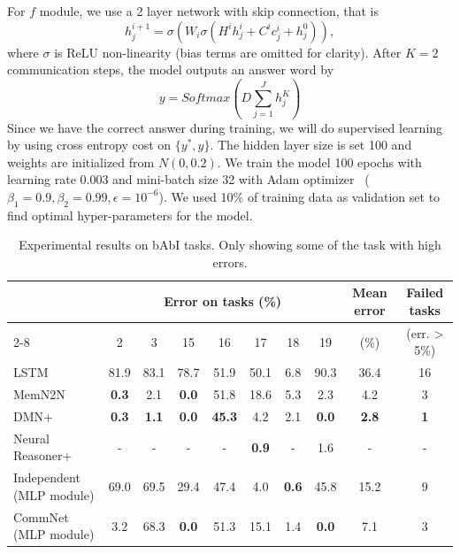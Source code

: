 \documentclass{article}
\begin{document}
For $f$ module, we use a 2 layer network with skip connection, that is 
\[ h_j^{i+1} = \sigma(W_i \sigma(H^i h_j^i + C^i c_j^i + h_j^0 ) ), \]
where $\sigma$ is ReLU non-linearity (bias terms are omitted for clarity). After $K=2$ communication steps, the model outputs an answer word by 
\[ y = Softmax(D \sum_{j=1}^J h_j^K) \]
Since we have the correct answer during training, we will do
supervised learning by using cross entropy cost on $\{y^*, y\}$. The
hidden layer size is set 100 and weights are initialized from
$N(0,0.2)$. We train the model 100 epochs with learning rate 0.003 and
mini-batch size 32 with Adam optimizer~\cite{kingma2015}
($\beta_1=0.9, \beta_2=0.99, \epsilon=10^{-6}$). We used 10\% of
training data as validation set to find optimal hyper-parameters for
the model.

\begin{table}[h]
\centering
\small
\setlength{\tabcolsep}{4pt}
\begin{tabular}{|l|c|c|c|c|c|c|c|c|c|} 
\hline
                  & \multicolumn{7}{|c|}{Error on tasks (\%)} & Mean error & Failed tasks \\ \cline{2-8}
                  & 2 & 3 & 15 & 16 & 17 & 18 & 19 & (\%) & (err. > 5\%) \\ \hline
LSTM~\cite{end2endmemnn}        & 81.9 & 83.1 & 78.7 & 51.9 & 50.1 & 6.8 & 90.3 & 36.4 & 16 \\ \hline
MemN2N~\cite{end2endmemnn}      & \textbf{0.3} & 2.1 & \textbf{0.0} & 51.8 & 18.6 & 5.3 & 2.3 &  4.2 &  3 \\ \hline
DMN+~\cite{XiongMS16}           & \textbf{0.3} & \textbf{1.1} & \textbf{0.0} & \textbf{45.3} & 4.2 & 2.1 & \textbf{0.0} & \textbf{2.8} &  \textbf{1} \\ \hline
Neural Reasoner+~\cite{Peng15}          & - & - & - & - & \textbf{0.9} & - & 1.6 & - &  - \\ \hline
Independent (MLP module)  & 69.0 & 69.5 & 29.4 & 47.4 & 4.0 & \textbf{0.6} & 45.8 & 15.2 &  9 \\ \hline
\hline
CommNet (MLP module)  & 3.2 & 68.3 & \textbf{0.0} & 51.3 & 15.1 & 1.4 & \textbf{0.0} & 7.1 &  3 \\ \hline
\end{tabular}
\caption{Experimental results on bAbI tasks. Only showing some of the task with high errors.}
\label{tab:babi2}
\end{table}
\end{document}
